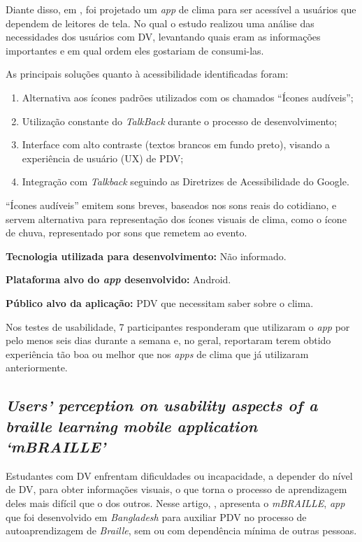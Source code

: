 Diante disso, em , foi projetado um \emph{app} de clima para ser acessível a usuários que dependem
de leitores de tela. No qual o estudo realizou uma análise das necessidades dos usuários com DV, levantando quais eram as informações
importantes e em qual ordem eles gostariam de consumi-las.

As principais soluções quanto à acessibilidade identificadas foram:

\begin{enumerate}
    \item Alternativa aos ícones padrões utilizados com os chamados ``Ícones audíveis'';
    \item Utilização constante do \emph{TalkBack} durante o processo de desenvolvimento;
    \item Interface com alto contraste (textos brancos em fundo preto), visando a experiência de usuário (UX) de PDV\@;
    \item Integração com \emph{Talkback} seguindo as Diretrizes de Acessibilidade do Google.
\end{enumerate}

``Ícones audíveis'' emitem sons breves, baseados nos sons reais do cotidiano, e servem alternativa para representação dos ícones
visuais de clima, como o ícone de chuva, representado por sons que remetem ao evento.

\textbf{Tecnologia utilizada para desenvolvimento:} Não informado.

\textbf{Plataforma alvo do \emph{app} desenvolvido:} Android.

\textbf{Público alvo da aplicação:} PDV que necessitam saber sobre o clima\@.

Nos testes de usabilidade, 7 participantes responderam que utilizaram o \emph{app} por pelo menos seis dias durante a semana e, no geral, reportaram terem obtido experiência tão boa ou melhor que nos \emph{apps} de clima que já utilizaram anteriormente.

\subsection{\emph{Users’ perception on usability aspects of a braille learning mobile application ‘mBRAILLE’}}

Estudantes com DV enfrentam dificuldades ou incapacidade, a depender do nível de DV, para obter informações visuais, o que torna
o processo de aprendizagem deles mais difícil que o dos outros. Nesse artigo, , apresenta o \emph{mBRAILLE},
\emph{app} que foi desenvolvido em \emph{Bangladesh} para auxiliar PDV no processo de autoaprendizagem de \emph{Braille}, sem ou com
dependência mínima de outras pessoas.

